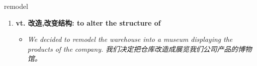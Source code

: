 
\begin{frame}
{\huge remodel}
\begin{center}
\begin{enumerate}\Large
  \item \textbf{vt. 改造,改变结构: to alter the structure of}
  \begin{itemize}
    \item \em{\Large{We decided to remodel the warehouse into a museum displaying the products of the company. 我们决定把仓库改造成展览我们公司产品的博物馆。}}
  \end{itemize}
\end{enumerate}
\end{center}
\end{frame}
